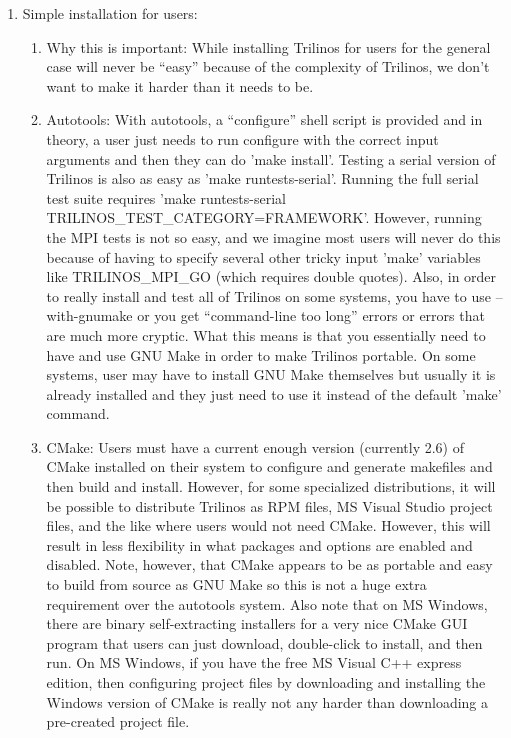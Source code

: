 \documentclass[pdf,ps2pdf,11pt]{SANDreport}
\begin{document}
\begin{enumerate}
\begin{enumerate}
  \end{enumerate}

{}\item Simple installation for users:

  \begin{enumerate}

  {}\item Why this is important: While installing Trilinos for users
  for the general case will never be ``easy'' because of the
  complexity of Trilinos, we don't want to make it harder than it
  needs to be.

  {}\item Autotools: With autotools, a ``configure'' shell script is
  provided and in theory, a user just needs to run configure with the
  correct input arguments and then they can do 'make install'.
  Testing a serial version of Trilinos is also as easy as 'make
  runtests-serial'.  Running the full serial test suite requires 'make
  runtests-serial TRILINOS\_TEST\_CATEGORY=FRAMEWORK'.  However,
  running the MPI tests is not so easy, and we imagine most users will
  never do this because of having to specify several other tricky
  input 'make' variables like TRILINOS\_MPI\_GO (which requires double
  quotes).  Also, in order to really install and test all of Trilinos
  on some systems, you have to use --with-gnumake or you get
  ``command-line too long'' errors or errors that are much more
  cryptic.  What this means is that you essentially need to have and
  use GNU Make in order to make Trilinos portable.  On some systems,
  user may have to install GNU Make themselves but usually it is
  already installed and they just need to use it instead of the
  default 'make' command.

  {}\item CMake: Users must have a current enough version (currently
  2.6) of CMake installed on their system to configure and generate
  makefiles and then build and install.  However, for some specialized
  distributions, it will be possible to distribute Trilinos as RPM
  files, MS Visual Studio project files, and the like where users
  would not need CMake.  However, this will result in less flexibility
  in what packages and options are enabled and disabled.  Note,
  however, that CMake appears to be as portable and easy to build from
  source as GNU Make so this is not a huge extra requirement over the
  autotools system.  Also note that on MS Windows, there are binary
  self-extracting installers for a very nice CMake GUI program that
  users can just download, double-click to install, and then run.  On
  MS Windows, if you have the free MS Visual C++ express edition, then
  configuring project files by downloading and installing the Windows
  version of CMake is really not any harder than downloading a
  pre-created project file.


\end{enumerate}
\end{enumerate}
\end{document}

